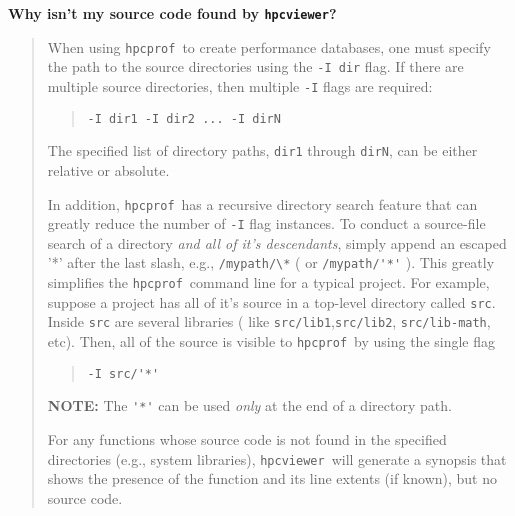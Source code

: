 \documentclass{article}
\newcommand{\hpcprof}{\texttt{hpcprof}}
\newcommand{\hpcviewer}{\texttt{hpcviewer}}
\begin{document}
\textbf{Why isn't my source code found by \hpcviewer ?}
\begin{comment}
(circular links in recursive search may lead to  inf loop)
\end{comment}
\begin{quote}
When using \hpcprof\ to create performance databases, one must specify the path 
to the source directories using the \verb|-I dir| flag. If there are multiple
source directories, then multiple \verb|-I| flags are required:
\begin{quote}
 \verb|-I dir1 -I dir2 ... -I dirN|
\end{quote}
The specified list of directory paths, \verb|dir1| through
\verb|dirN|, can be either relative or absolute.

In addition, \hpcprof\ has a recursive directory search feature that
can greatly reduce the number of \verb|-I| flag instances. To conduct
a source-file search of a directory \emph{and all of it's descendants},
simply append an escaped '*' after the last slash, e.g.,
\verb|/mypath/\*| ( or \verb|/mypath/'*'| ). This greatly simplifies
the \hpcprof\ command line for a typical project. For example, suppose
a project has all of it's source in a top-level directory called
\verb|src|. Inside \verb|src| are several libraries ( like
\verb|src/lib1|,\verb|src/lib2|, \verb|src/lib-math|, etc). Then, all
of the source is visible to \hpcprof\ by using the single flag
\begin{quote}
\verb|-I src/'*'|
\end{quote}

\textbf{NOTE:} The \verb|'*'| can be used \emph{only} at the end of
a directory path.

For any functions whose source code is not found in the specified directories
(e.g., system libraries), \hpcviewer\ will generate a synopsis that shows
the presence of the function and its line extents (if known), but no
source code.
\end{quote}
\end{document}
